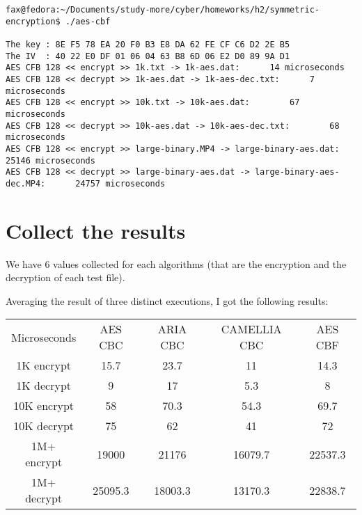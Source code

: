 \documentclass{article}
\begin{document}
\begin{verbatim}
fax@fedora:~/Documents/study-more/cyber/homeworks/h2/symmetric-encryption$ ./aes-cbf

The key : 8E F5 78 EA 20 F0 B3 E8 DA 62 FE CF C6 D2 2E B5 
The IV  : 40 22 E0 DF 01 06 04 63 B8 6D 06 E2 D0 89 9A D1 
AES CFB 128 << encrypt >> 1k.txt -> 1k-aes.dat:		 14 microseconds
AES CFB 128 << decrypt >> 1k-aes.dat -> 1k-aes-dec.txt:		 7 microseconds
AES CFB 128 << encrypt >> 10k.txt -> 10k-aes.dat:		 67 microseconds
AES CFB 128 << decrypt >> 10k-aes.dat -> 10k-aes-dec.txt:		 68 microseconds
AES CFB 128 << encrypt >> large-binary.MP4 -> large-binary-aes.dat:		 25146 microseconds
AES CFB 128 << decrypt >> large-binary-aes.dat -> large-binary-aes-dec.MP4:		 24757 microseconds	
\end{verbatim}	

\section{Collect the results}

We have 6 values collected for each algorithms (that are the encryption and the decryption of each test file).

Averaging the result of three distinct executions, I got the following results:

\begin{tabular}{ c c c c c }
	Microseconds & AES CBC & ARIA CBC  &CAMELLIA CBC & AES CBF  \\
	1K  encrypt  & 15.7 & 23.7 & 11 & 14.3 \\
	1K decrypt & 9 & 17 & 5.3 & 8 \\
	10K  encrypt  & 58 & 70.3 & 54.3 & 69.7 \\
	10K  decrypt  &75 & 62 & 41 & 72 \\
	1M+  encrypt  & 19000 & 21176 & 16079.7 & 22537.3 \\
	1M+  decrypt  & 25095.3 & 18003.3 & 13170.3 & 22838.7 \\
\end{tabular}

\end{document}
